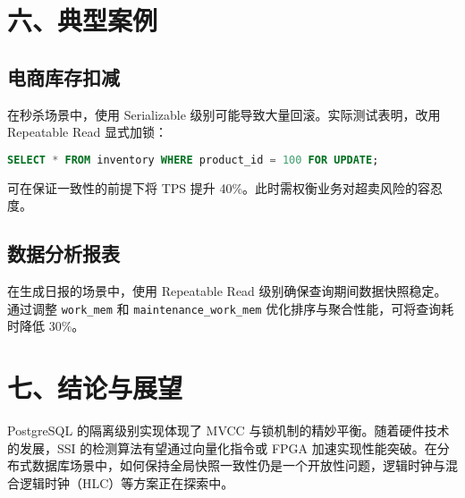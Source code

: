 \chapter{六、典型案例}
\section{电商库存扣减}
在秒杀场景中，使用 Serializable 级别可能导致大量回滚。实际测试表明，改用 Repeatable Read 显式加锁：\par
\begin{lstlisting}[language=sql]
SELECT * FROM inventory WHERE product_id = 100 FOR UPDATE;
\end{lstlisting}
可在保证一致性的前提下将 TPS 提升 40\%{}。此时需权衡业务对超卖风险的容忍度。\par
\section{数据分析报表}
在生成日报的场景中，使用 Repeatable Read 级别确保查询期间数据快照稳定。通过调整 \verb!work_mem! 和 \verb!maintenance_work_mem! 优化排序与聚合性能，可将查询耗时降低 30\%{}。\par
\chapter{七、结论与展望}
PostgreSQL 的隔离级别实现体现了 MVCC 与锁机制的精妙平衡。随着硬件技术的发展，SSI 的检测算法有望通过向量化指令或 FPGA 加速实现性能突破。在分布式数据库场景中，如何保持全局快照一致性仍是一个开放性问题，逻辑时钟与混合逻辑时钟（HLC）等方案正在探索中。\par
